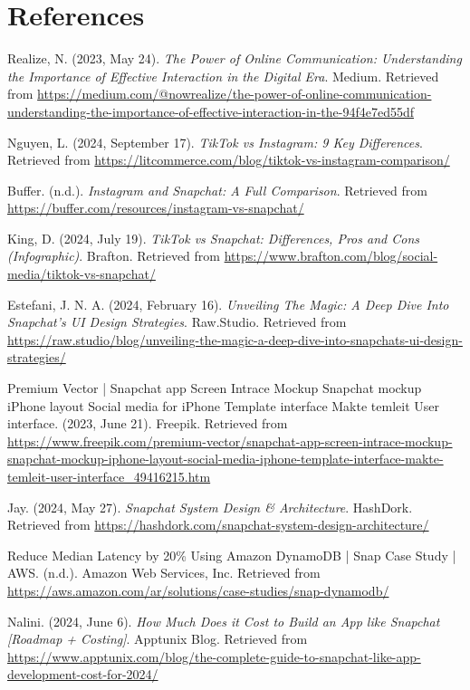 \documentclass{article}
\begin{document}
\newpage
\section{References}
\begin{thebibliography}{9}
Realize, N. (2023, May 24). \emph{The Power of Online Communication: Understanding the Importance of Effective Interaction in the Digital Era}. Medium. Retrieved from \url{https://medium.com/@nowrealize/the-power-of-online-communication-understanding-the-importance-of-effective-interaction-in-the-94f4e7ed55df}

Nguyen, L. (2024, September 17). \emph{TikTok vs Instagram: 9 Key Differences}. Retrieved from \url{https://litcommerce.com/blog/tiktok-vs-instagram-comparison/}

Buffer. (n.d.). \emph{Instagram and Snapchat: A Full Comparison}. Retrieved from \url{https://buffer.com/resources/instagram-vs-snapchat/}

King, D. (2024, July 19). \emph{TikTok vs Snapchat: Differences, Pros and Cons (Infographic)}. Brafton. Retrieved from \url{https://www.brafton.com/blog/social-media/tiktok-vs-snapchat/}

Estefani, J. N. A. (2024, February 16). \emph{Unveiling The Magic: A Deep Dive Into Snapchat's UI Design Strategies}. Raw.Studio. Retrieved from \url{https://raw.studio/blog/unveiling-the-magic-a-deep-dive-into-snapchats-ui-design-strategies/}

Premium Vector | Snapchat app Screen Intrace Mockup Snapchat mockup iPhone layout Social media for iPhone Template interface Makte temleit User interface. (2023, June 21). Freepik. Retrieved from \url{https://www.freepik.com/premium-vector/snapchat-app-screen-intrace-mockup-snapchat-mockup-iphone-layout-social-media-iphone-template-interface-makte-temleit-user-interface_49416215.htm}

Jay. (2024, May 27). \emph{Snapchat System Design \& Architecture}. HashDork. Retrieved from \url{https://hashdork.com/snapchat-system-design-architecture/}

Reduce Median Latency by 20\% Using Amazon DynamoDB | Snap Case Study | AWS. (n.d.). Amazon Web Services, Inc. Retrieved from \url{https://aws.amazon.com/ar/solutions/case-studies/snap-dynamodb/}

Nalini. (2024, June 6). \emph{How Much Does it Cost to Build an App like Snapchat [Roadmap + Costing]}. Apptunix Blog. Retrieved from \url{https://www.apptunix.com/blog/the-complete-guide-to-snapchat-like-app-development-cost-for-2024/}
\end{thebibliography}
\end{document}
